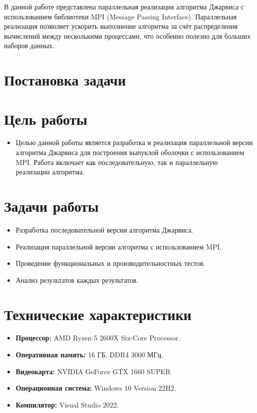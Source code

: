 \documentclass[12pt]{article}
\begin{document}
В данной работе представлена параллельная реализация алгоритма Джарвиса с использованием библиотеки MPI (Message Passing Interface). Параллельная реализация позволяет ускорить выполнение алгоритма за счёт распределения вычислений между несколькими процессами, что особенно полезно для больших наборов данных.

\section*{Постановка задачи}

\section*{Цель работы}

\begin{itemize}
\item Целью данной работы является разработка и реализация параллельной версии алгоритма Джарвиса для построения выпуклой оболочки с использованием MPI. Работа включает как последовательную, так и параллельную реализации алгоритма.
\end{itemize}

\section*{Задачи работы}

\begin{itemize}
\item Разработка последовательной версии алгоритма Джарвиса.
\item Реализация параллельной версии алгоритма с использованием MPI.
\item Проведение функциональных и производительностных тестов.
\item Анализ результатов каждых результатов.
\end{itemize}

\section*{Технические характеристики}

\begin{itemize}
\item \textbf{Процессор:} AMD Ryzen 5 2600X Six-Core Processor.
\item \textbf{Оперативная память:} 16 ГБ, DDR4 3000 МГц.
\item \textbf{Видеокарта:} NVIDIA GeForce GTX 1660 SUPER
\item \textbf{Операционная система:} Windows 10 Version 22H2.
\item \textbf{Компилятор:} Visual Studio 2022.
\end{itemize}
\end{document}
